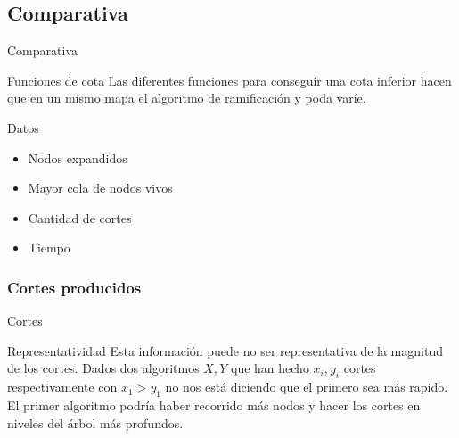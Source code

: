 \subsection{Comparativa}
\begin{frame}{Comparativa}
	\begin{block}{Funciones de cota}
	Las diferentes funciones para conseguir una cota inferior hacen que en un mismo mapa
	el algoritmo de ramificación y poda varíe. 
	\end{block}
	
	\begin{exampleblock}{Datos}
	\begin{itemize}
		\item Nodos expandidos
		\item Mayor cola de nodos vivos
		\item Cantidad de cortes
		\item Tiempo
	\end{itemize}
	\end{exampleblock}
\end{frame}



\subsubsection{Cortes producidos}
\begin{frame}{Cortes}
	\begin{block}{Representatividad}
	Esta información puede no ser representativa de la
	magnitud de los cortes. Dados dos algoritmos $X,Y$ que han hecho $x_i,y_i$ cortes
	respectivamente con $x_1>y_1$ no nos está diciendo que el primero sea más rapido.
	El primer algoritmo podría haber recorrido más nodos y hacer los cortes en niveles 
	del árbol más profundos. 
	\end{block}
\end{frame}
 
